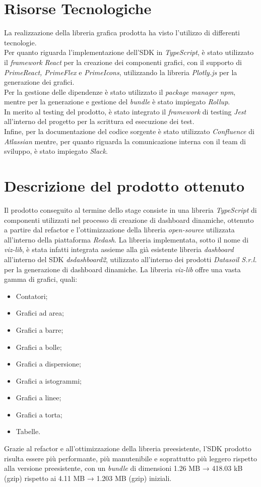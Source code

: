 \section{Risorse Tecnologiche}
La realizzazione della libreria grafica prodotta ha visto l'utilizzo di differenti tecnologie. \\
Per quanto riguarda l'implementazione dell'SDK in \textit{TypeScript}, è stato utilizzato il \textit{\gls{framework}\glox} \textit{React} per la creazione dei componenti grafici,
con il supporto di \textit{PrimeReact, PrimeFlex} e \textit{PrimeIcons}, utilizzando la libreria \textit{Plotly.js} per la generazione dei grafici. \\
Per la gestione delle dipendenze è stato utilizzato il \textit{package manager} \textit{npm}, mentre per la generazione e gestione del \textit{\gls{bundle}\glox} è stato impiegato \textit{Rollup}. \\
In merito al testing del prodotto, è stato integrato il \textit{framework} di testing \textit{Jest} all'interno del progetto per la scrittura ed esecuzione dei test. \\
Infine, per la documentazione del codice sorgente è stato utilizzato \textit{Confluence} di \textit{Atlassian} mentre, per quanto riguarda la comunicazione interna con il team di sviluppo,
è stato impiegato \textit{Slack}.

\section{Descrizione del prodotto ottenuto}
Il prodotto conseguito al termine dello stage consiste in una libreria \textit{TypeScript} di componenti utilizzati nel processo di creazione di dashboard dinamiche,
ottenuto a partire dal refactor e l'ottimizzazione della libreria \textit{open-source} utilizzata all'interno della piattaforma \textit{Redash}.
La libreria implementata, sotto il nome di \textit{viz-lib}, è stata infatti integrata assieme alla già esistente libreria \textit{dashboard} all'interno del SDK
\textit{dsdashboard2}, utilizzato all'interno dei prodotti \textit{Datasoil S.r.l.} per la generazione di dashboard dinamiche.
La libreria \textit{viz-lib} offre una vasta gamma di grafici, quali:
\begin{itemize}
      \item Contatori;
      \item Grafici ad area;
      \item Grafici a barre;
      \item Grafici a bolle;
      \item Grafici a dispersione;
      \item Grafici a istogrammi;
      \item Grafici a linee;
      \item Grafici a torta;
      \item Tabelle.
\end{itemize}
Grazie al refactor e all'ottimizzazione della libreria preesistente, l'SDK prodotto risulta essere più performante, più manutenibile e soprattutto più leggero rispetto
alla versione preesistente, con un \textit{bundle} di dimensioni 1.26 MB → 418.03 kB (gzip) rispetto ai 4.11 MB → 1.203 MB (gzip) iniziali.


